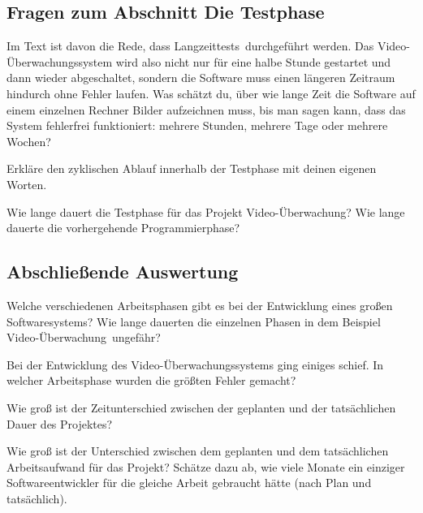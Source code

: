 \subsection*{Fragen zum Abschnitt \glqq Die Testphase\grqq}
\begin{compactenum}[a)]
\item Im Text ist davon die Rede, dass \glqq Langzeittests\grqq\ durchgeführt
werden. Das Video-Überwachungssystem wird also nicht nur für eine halbe Stunde
gestartet und dann wieder abgeschaltet, sondern die Software muss einen
längeren Zeitraum hindurch ohne Fehler laufen. Was schätzt du, über wie lange
Zeit die Software auf einem einzelnen Rechner Bilder aufzeichnen muss, bis man
sagen kann, dass das System fehlerfrei funktioniert: mehrere Stunden, mehrere
Tage oder mehrere Wochen?
\item Erkläre den zyklischen Ablauf innerhalb der Testphase mit deinen eigenen
Worten.
\item Wie lange dauert die Testphase für das Projekt \glqq
Video-Überwachung\grqq ? Wie lange dauerte die vorhergehende Programmierphase?
\end{compactenum}

\subsection*{Abschließende Auswertung}
\begin{compactenum}[a)]
\item Welche verschiedenen Arbeitsphasen gibt es bei der Entwicklung eines
großen Softwaresystems? Wie lange dauerten die einzelnen Phasen in dem Beispiel
\glqq Video-Überwachung\grqq\ ungefähr?
\item Bei der Entwicklung des Video-Überwachungssystems ging einiges schief. In
welcher Arbeitsphase wurden die größten Fehler gemacht? 
\item Wie groß ist der Zeitunterschied zwischen der geplanten und der
tatsächlichen Dauer des Projektes? 
\item Wie groß ist der Unterschied zwischen dem geplanten und dem tatsächlichen
Arbeitsaufwand für das Projekt? Schätze dazu ab, wie viele Monate ein einziger
Softwareentwickler für die gleiche Arbeit gebraucht hätte (nach Plan und
tatsächlich).
\end{compactenum}
